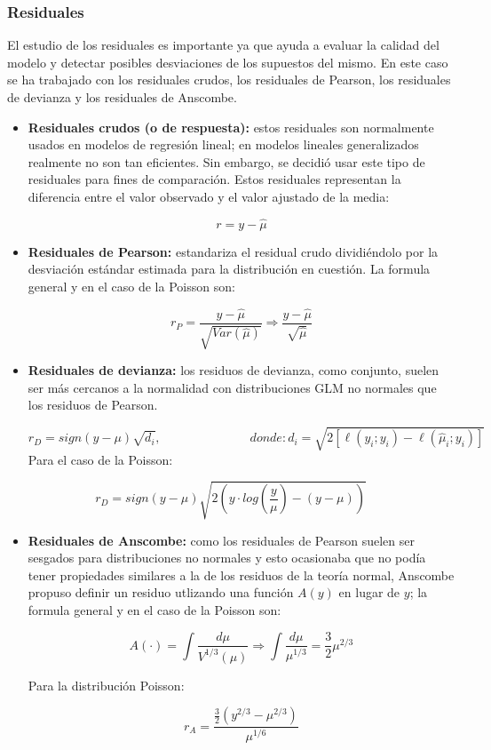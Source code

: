 \documentclass[
  letterpaper,
  DIV=11,
  numbers=noendperiod]{scrartcl}
\begin{document}
\subsubsection{Residuales}\label{residuales}

El estudio de los residuales es importante ya que ayuda a evaluar la
calidad del modelo y detectar posibles desviaciones de los supuestos del
mismo. En este caso se ha trabajado con los residuales crudos, los
residuales de Pearson, los residuales de devianza y los residuales de
Anscombe.

\begin{itemize}
\item
  \textbf{Residuales crudos (o de respuesta):} estos residuales son
  normalmente usados en modelos de regresión lineal; en modelos lineales
  generalizados realmente no son tan eficientes. Sin embargo, se decidió
  usar este tipo de residuales para fines de comparación. Estos
  residuales representan la diferencia entre el valor observado y el
  valor ajustado de la media:

  \[r = y-\hat{\mu}\]
\item
  \textbf{Residuales de Pearson:} estandariza el residual crudo
  dividiéndolo por la desviación estándar estimada para la distribución
  en cuestión. La formula general y en el caso de la Poisson son:

  \[r_{P}=\frac{y-\hat{\mu}}{\sqrt{Var(\hat{\mu})}}\Longrightarrow\frac{y-\hat{\mu}}{\sqrt{\hat{\mu}}}\]
\item
  \textbf{Residuales de devianza:} los residuos de devianza, como
  conjunto, suelen ser más cercanos a la normalidad con distribuciones
  GLM no normales que los residuos de Pearson.

  \[r_{D}=sign(y-\mu)\sqrt{d_{i}},\hspace{3cm}donde:d_{i}=\sqrt{2 \left[ \ell(y_i; y_i) - \ell(\hat{\mu}_i; y_i) \right]}\]
  Para el caso de la Poisson:
\end{itemize}

\[r_{D}=sign(y-\mu)\sqrt{2\left(y\cdot log(\frac{y}{\mu})-(y-\mu)\right)}\]

\begin{itemize}
\item
  \textbf{Residuales de Anscombe:} como los residuales de Pearson suelen
  ser sesgados para distribuciones no normales y esto ocasionaba que no
  podía tener propiedades similares a la de los residuos de la teoría
  normal, Anscombe propuso definir un residuo utlizando una función
  \(A(y)\) en lugar de \(y\); la formula general y en el caso de la
  Poisson son:

  \[A(\cdot)=\int \frac{d\mu}{V^{1/3}(\mu)}\Longrightarrow\int\frac{d\mu}{\mu^{1/3}}=\frac{3}{2}\mu^{2/3}\]

  Para la distribución Poisson:

  \[r_{A}=\frac{\frac{3}{2}(y^{2/3}-\mu^{2/3})}{\mu^{1/6}}\]
\end{itemize}
\end{document}
